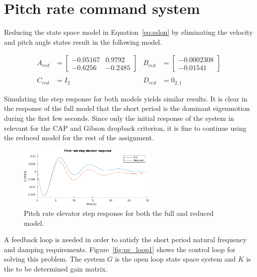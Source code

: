 \section{Pitch rate command system}

Reducing the state space model in Equation~\ref{eq:sslon} by eliminating the velocity and pitch angle states result in the following model.

\begin{equation}
    \begin{aligned}
        A_{red}&=\begin{bmatrix}
            -0.05167 &   0.9792 \\
            -0.6256  & -0.2485
        \end{bmatrix} &
        B_{red}&=\begin{bmatrix}
            -0.0002308 \\
            -0.01541
        \end{bmatrix} \\\\
        C_{red}&=I_2 &
        D_{red}&=0_{2,1}
    \end{aligned}
\end{equation}

Simulating the step response for both models yields similar results. It is clear in the response of the full model that the short period is the dominant eigenmotion during the first few seconds. Since only the initial response of the system in relevant for the CAP and Gibson dropback criterion, it is fine to continue using the reduced model for the rest of the assignment.

\begin{figure}[ht]
    \centering
    \includegraphics[width=0.6\textwidth]{figures/pc_acre_step.pdf}    
    \caption{Pitch rate elevator step response for both the full and reduced model.}
    \label{fig:pc_acre_step}
\end{figure}

A feedback loop is needed in order to satisfy the short period natural frequency and damping requirements. Figure~\ref{fig:pc_loop1} shows the control loop for solving this problem. The system $G$ is the open loop state space system and $K$ is the to be determined gain matrix.

